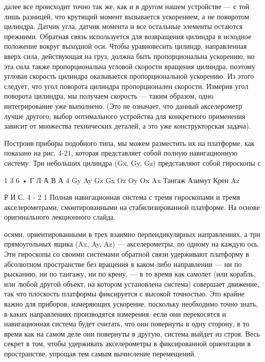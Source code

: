 \documentclass[10pt,oneside]{article}
\newcommand{\TipsSubsection}[1]{\par\vspace{6bp}{\normalsize\bfseries #1\par}\vspace{2bp}}
\begin{document}
далее все происходит точно так же, как и в другом нашем устройстве --- с той лишь разницей, что крутящий момент вызывается ускорением, а не поворотом цилиндра. Датчик угла, датчик момента и все остальные элементы остаются прежними. Обратная связь используется для возвращения цилиндра в исходное положение вокруг выходной оси. Чтобы уравновесить цилиндр, направленная вверх сила, действующая на груз, должна быть пропорциональна ускорению, но эта сила также пропорциональна угловой скорости вращения цилиндра, поэтому угловая скорость цилиндра оказывается пропорциональной ускорению. Из этого следует, что угол поворота цилиндра пропорционален скорости. Измерив угол поворота цилиндра, мы получаем скорость --- таким образом, одно интегрирование уже выполнено. (Это не означает, что данный акселерометр лучше другого; выбор оптимального устройства для конкретного применения зависит от множества технических деталей, а это уже конструкторская задача).\par

\TipsSubsection{4-8 Полная навигационная система}

Построив приборы подобного типа, мы можем разместить их на платформе, как показано на рис. 4-21, которая представляет собой полную навигационную систему. Три небольших цилиндра (Gx, Gy, Gz) представляют собой гироскопы с\par

1 3 6 • Г Л А В А  4 Gy Ay Gz Gx Oz Oy Ox Ax Тангаж Азимут Крен Az\par

Р И С.  4 - 2 1 Полная навигационная система с тремя гироскопами и тремя акселерометрами, смонтированными на стабилизированной платформе. На основе оригинального лекционного слайда.\par

осями, ориентированными в трех взаимно перпендикулярных направлениях, а три прямоугольных ящика (Ax, Ay, Az) --- акселерометры, по одному на каждую ось. Эти гироскопы со своими системами обратной связи удерживают платформу в абсолютном пространстве без вращения в каком-либо направлении --- ни по рысканию, ни по тангажу, ни по крену, --- в то время как самолет (или корабль, или любой другой объект, на котором установлена система) совершает движение, так что плоскость платформы фиксируется с высокой точностью. Это крайне важно для приборов, измеряющих ускорение, поскольку необходимо точно знать, в каких направлениях производятся измерения: если они перекосятся и навигационная система будет считать, что они повернуты в одну сторону, в то время как на самом деле они повернуты в другую, система выйдет из строя. Весь секрет в том, чтобы удерживать акселерометры в фиксированной ориентации в пространстве, упрощая тем самым вычисление перемещений.\par
\end{document}
